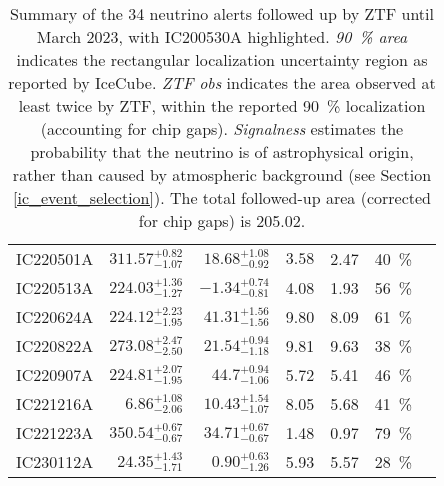 \begin{table*}
\begin{tabular}{l r r r r c c}
        IC220501A & $311.57^{+0.82}_{-1.07}$ & $18.68^{+1.08}_{-0.92}$ & $3.58$ & 2.47 & \SI{40}{\percent}&\cite{IC220501A1, IC220501A2}\\
        IC220513A & $224.03^{+1.36}_{-1.27}$ & $-1.34^{+0.74}_{-0.81}$ & 4.08 & 1.93 & \SI{56}{\percent}&\cite{IC220513A1, IC220513A2}\\
        IC220624A & $224.12^{+2.23}_{-1.95}$ & $41.31^{+1.56}_{-1.56}$ & 9.80 & 8.09 & \SI{61}{\percent}&\cite{IC220624A1, IC220624A2}\\
        IC220822A & $273.08^{+2.47}_{-2.50}$ & $21.54^{+0.94}_{-1.18}$ & 9.81 & 9.63 & \SI{38}{\percent}&\cite{IC220822A1, IC220822A2}\\
        IC220907A & $224.81^{+2.07}_{-1.95}$ & $44.7^{+0.94}_{-1.06}$ & 5.72 & 5.41 & \SI{46}{\percent}&\cite{IC220907A1, IC220907A2, IC220907A3}\\
        IC221216A & $6.86^{+1.08}_{-2.06}$ & $10.43^{+1.54}_{-1.07}$ & 8.05 & 5.68 & \SI{41}{\percent}&\cite{IC221216A1, IC221216A2}\\
        IC221223A & $350.54^{+0.67}_{-0.67}$ & $34.71^{+0.67}_{-0.67}$ & 1.48 & 0.97 & \SI{79}{\percent}&\cite{IC221223A1, IC221223A2}\\
        IC230112A & $24.35^{+1.43}_{-1.71}$ & $0.90^{+0.63}_{-1.26}$ & 5.93 & 5.57 & \SI{28}{\percent}&\cite{IC230112A1, IC230112A2}\\
        \hline
    \end{tabular}
    \caption[Summary of the 34 neutrino alerts followed up by ZTF]{Summary of the 34 neutrino alerts followed up by ZTF until March 2023, with IC200530A highlighted. \textit{\SI{90}{\percent} area} indicates the rectangular localization uncertainty region as reported by IceCube. \textit{ZTF obs} indicates the area observed at least twice by ZTF, within the reported \SI{90}{\percent} localization (accounting for chip gaps). \textit{Signalness} estimates the probability that the neutrino is of astrophysical origin, rather than caused by atmospheric background (see Section \ref{ic_event_selection}). The total followed-up area (corrected for chip gaps) is \SI{205.02}{\square\deg}.}
    \label{tab:neutrino_alert_overview}
\end{table*}

